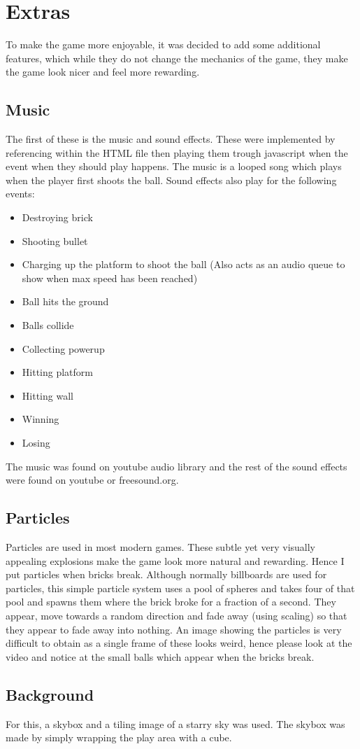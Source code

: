 \chapter{Extras}
To make the game more enjoyable, it was decided to add some additional features, which while they do not change the mechanics of the game, they make the game look nicer and feel more rewarding.

\section{Music}
The first of these is the music and sound effects. These were implemented by referencing within the HTML file then playing them trough javascript when the event when they should play happens. The music is a looped song which plays when the player first shoots the ball. Sound effects also play for the following events:
\begin{itemize}
	\item Destroying brick
	\item Shooting bullet
	\item Charging up the platform to shoot the ball (Also acts as an audio queue to show when max speed has been reached)
	\item Ball hits the ground
	\item Balls collide
	\item Collecting powerup
	\item Hitting platform
	\item Hitting wall
	\item Winning
	\item Losing
\end{itemize}
The music was found on youtube audio library and the rest of the sound effects were found on youtube or freesound.org.

\section{Particles}
Particles are used in most modern games. These subtle yet very visually appealing explosions make the game look more natural and rewarding. Hence I put particles when bricks break. Although normally billboards are used for particles, this simple particle system uses a pool of spheres and takes four of that pool and spawns them where the brick broke for a fraction of a second. They appear, move towards a random direction and fade away (using scaling) so that they appear to fade away into nothing. An image showing the particles is very difficult to obtain as a single frame of these looks weird, hence please look at the video and notice at the small balls which appear when the bricks break.

\section{Background}
For this, a skybox and a tiling image of a starry sky was used. The skybox was made by simply wrapping the play area with a cube.